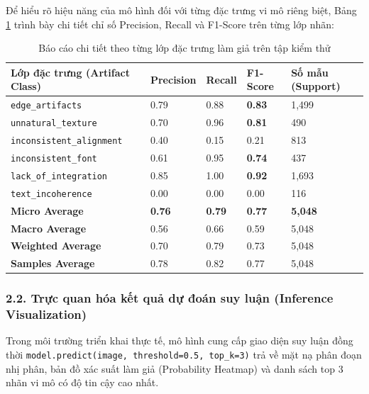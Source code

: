 Để hiểu rõ hiệu năng của mô hình đối với từng đặc trưng vi mô riêng biệt, Bảng \ref{tab:cls_report} trình bày chi tiết chỉ số Precision, Recall và F1-Score trên từng lớp nhãn:
\begin{table}[H]
    \centering
    \caption{Báo cáo chi tiết theo từng lớp đặc trưng làm giả trên tập kiểm thử}
    \label{tab:cls_report}
    \vspace{0.2cm}
    \renewcommand{\arraystretch}{1.2}
    \begin{tabular}{|m{5.5cm}|m{2cm}|m{2cm}|m{2cm}|m{2.5cm}|}
        \hline
        \textbf{Lớp đặc trưng (Artifact Class)} & \textbf{Precision} & \textbf{Recall} & \textbf{F1-Score} & \textbf{Số mẫu (Support)} \\
        \hline
        \texttt{edge\_artifacts} & 0.79 & 0.88 & \textbf{0.83} & 1,499 \\
        \hline
        \texttt{unnatural\_texture} & 0.70 & 0.96 & \textbf{0.81} & 490 \\
        \hline
        \texttt{inconsistent\_alignment} & 0.40 & 0.15 & 0.21 & 813 \\
        \hline
        \texttt{inconsistent\_font} & 0.61 & 0.95 & \textbf{0.74} & 437 \\
        \hline
        \texttt{lack\_of\_integration} & 0.85 & 1.00 & \textbf{0.92} & 1,693 \\
        \hline
        \texttt{text\_incoherence} & 0.00 & 0.00 & 0.00 & 116 \\
        \hline
        \hline
        \textbf{Micro Average} & \textbf{0.76} & \textbf{0.79} & \textbf{0.77} & \textbf{5,048} \\
        \hline
        \textbf{Macro Average} & 0.56 & 0.66 & 0.59 & 5,048 \\
        \hline
        \textbf{Weighted Average} & 0.70 & 0.79 & 0.73 & 5,048 \\
        \hline
        \textbf{Samples Average} & 0.78 & 0.82 & 0.77 & 5,048 \\
        \hline
    \end{tabular}
\end{table}

\clearpage
\subsubsection{2.2. Trực quan hóa kết quả dự đoán suy luận (Inference Visualization)}
\indent\indent Trong môi trường triển khai thực tế, mô hình cung cấp giao diện suy luận đồng thời \texttt{model.predict(image, threshold=0.5, top\_k=3)} trả về mặt nạ phân đoạn nhị phân, bản đồ xác suất làm giả (Probability Heatmap) và danh sách top 3 nhãn vi mô có độ tin cậy cao nhất.

